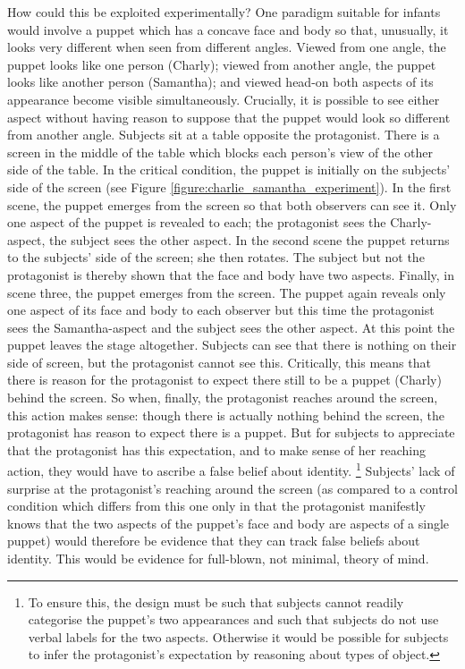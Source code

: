 \documentclass[12pt,\papersize]{extarticle}
\begin{document}
How could this be exploited experimentally?  One paradigm suitable for infants would involve a puppet which has a concave face and body so that,  unusually, it looks very different when seen from different angles.  Viewed from one angle, the puppet looks like one person (Charly); viewed from another angle, the puppet looks like another person (Samantha); and viewed head-on both aspects of its appearance become visible simultaneously.  Crucially, it is possible to see either aspect without having reason to suppose that the puppet would look so different from another angle.  Subjects sit at a table opposite the protagonist.   There is a screen in the middle of the table which blocks each person’s view of the other side of the table.  In the critical condition, the puppet is initially on the subjects’ side of the screen (see Figure \vref{figure:charlie_samantha_experiment}).  In the first scene, the puppet emerges from the screen so that both observers can see it.  Only one aspect of the puppet is revealed to each; the protagonist sees the Charly-aspect, the subject sees the other aspect.  In the second scene the puppet returns to the subjects’ side of the screen; she then rotates.  The subject but not the protagonist is thereby shown that the face and body have two aspects.  Finally, in scene three, the puppet emerges from the screen.  The puppet again reveals only one aspect of its face and body to each observer but this time the protagonist sees the Samantha-aspect and the subject sees the other aspect.  At this point the puppet leaves the stage altogether. Subjects can see that there is nothing on their side of screen, but the protagonist cannot see this. 
Critically, this means that there is reason for the  protagonist to expect there still to be a puppet (Charly) behind the screen.  
So when, finally, the protagonist reaches around the screen, this action makes sense:
	though there is actually nothing behind the screen, the protagonist has reason to expect there is a puppet.
But for subjects to appreciate that the protagonist has this expectation, and to make sense of her reaching action, they would have to ascribe a false belief about identity.%
\footnote{
	To ensure this, the design must be such that subjects cannot readily categorise the puppet’s two appearances and such that subjects do not use verbal labels for the two aspects.  Otherwise it would be possible for subjects to infer the protagonist’s expectation by reasoning about types of object. 
}  
Subjects' lack of surprise at the protagonist's reaching around the screen (as compared to  a control condition which differs from this one only in that the protagonist manifestly knows that the two aspects of the puppet’s face and body are aspects of a single puppet) would therefore be evidence that they can track false beliefs about identity.  
This would be evidence for full-blown, not minimal, theory of mind.
\end{document}
